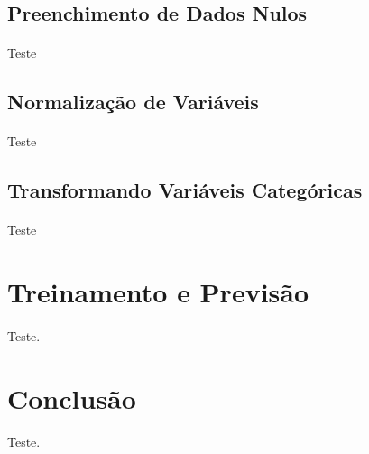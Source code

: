 \documentclass{article}
\begin{document}
		\subsection{Preenchimento de Dados Nulos}
			\paragraph{}Teste
		
		\subsection{Normalização de Variáveis}
			\paragraph{}Teste
		
		\subsection{Transformando Variáveis Categóricas}
			\paragraph{}Teste
		
		
\section{Treinamento e Previsão}
	\paragraph{}Teste.
	
\section{Conclusão}

	\paragraph{}Teste.
\end{document}
